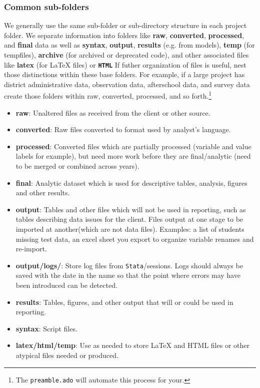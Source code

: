\documentclass[11pt]{article}
\begin{document}
\subsubsection{Common sub-folders}
We generally use the same sub-folder or sub-directory structure in each project folder. We separate information into folders like \textbf{raw}, \textbf{converted}, \textbf{processed}, and \textbf{final} data as well as \textbf{syntax}, \textbf{output}, \textbf{results} (e.g. from models), \textbf{temp} (for tempfiles), \textbf{archive} (for archived or deprecated code), and other associated files like \textbf{latex} (for \LaTeX{} files) or \textbf{\texttt{HTML}} If futher organization of files is useful, nest those distinctions within these base folders. For example, if a large project has district administrative data, observation data, afterschool data, and survey data create those folders within raw, converted, processed, and so forth.\footnote{The \texttt{preamble.ado} will automate this process for your.}
\begin{itemize}
	\item\textbf{raw}: Unaltered files as received from the client or other source.
	\item\textbf{converted}: Raw files converted to format used by analyst's language.
	\item\textbf{processed}: Converted files which are partially processed (variable and value labels for example), but need more work before they are final/analytic (need to be merged or combined across years).
	\item\textbf{final}: Analytic dataset which is used for descriptive tables, analysis, figures and other results.
	\item\textbf{output}: Tables and other files which will not be used in reporting, such as tables describing data issues for the client. Files output at one stage to be imported at another(which are not data files). Examples: a list of students missing test data, an excel sheet you export to organize variable renames and re-import.
	\item\textbf{output/logs/}: Store log files from \texttt{Stata}/\faRProject sessions. Logs should always be saved with the date in the name so that the point where errors may have been introduced can be detected.
	\item\textbf{results}: Tables, figures, and other output that will or could be used in reporting.
	\item\textbf{syntax}: Script files.
	\item\textbf{latex/html/temp}: Use as needed to store \LaTeX{} and HTML files or other atypical files needed or produced.
\end{itemize}
\end{document}
